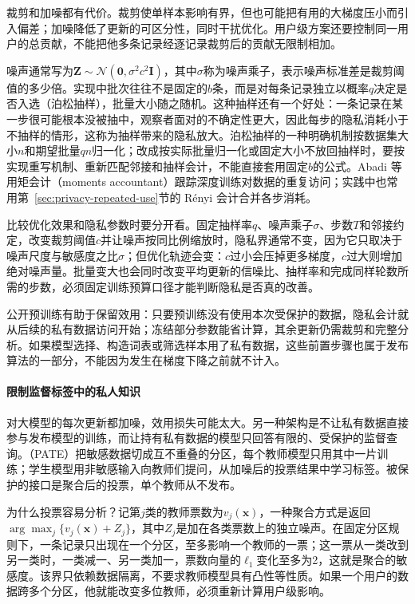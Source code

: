 裁剪和加噪都有代价。裁剪使单样本影响有界，但也可能把有用的大梯度压小而引入偏差；加噪降低了更新的可区分性，同时干扰优化。用户级方案还要控制同一用户的总贡献，不能把他多条记录经逐记录裁剪后的贡献无限制相加。

噪声通常写为$\bm Z\sim\mathcal N(\bm0,\sigma^2c^2\bm I)$，其中$\sigma$称为噪声乘子，表示噪声标准差是裁剪阈值的多少倍。实现中批次往往不是固定的$b$条，而是对每条记录独立以概率$q$决定是否入选（泊松抽样），批量大小随之随机。这种抽样还有一个好处：一条记录在某一步很可能根本没被抽中，观察者面对的不确定性更大，因此每步的隐私消耗小于不抽样的情形，这称为抽样带来的隐私放大。泊松抽样的一种明确机制按数据集大小$n$和期望批量$qn$归一化；改成按实际批量归一化或固定大小不放回抽样时，要按实现重写机制、重新匹配邻接和抽样会计，不能直接套用固定$b$的公式。Abadi 等用矩会计（moments accountant）跟踪深度训练对数据的重复访问；实践中也常用第~\ref{sec:privacy-repeated-use}节的 Rényi 会计合并各步消耗。

比较优化效果和隐私参数时要分开看。固定抽样率$q$、噪声乘子$\sigma$、步数$T$和邻接约定，改变裁剪阈值$c$并让噪声按同比例缩放时，隐私界通常不变，因为它只取决于噪声尺度与敏感度之比$\sigma$；但优化轨迹会变：$c$过小会压掉更多梯度，$c$过大则增加绝对噪声量。批量变大也会同时改变平均更新的信噪比、抽样率和完成同样轮数所需的步数，必须固定训练预算口径才能判断隐私是否真的改善。

公开预训练有助于保留效用：只要预训练没有使用本次受保护的数据，隐私会计就从后续的私有数据访问开始；冻结部分参数能省计算，其余更新仍需裁剪和完整分析。如果模型选择、构造词表或筛选样本用了私有数据，这些前置步骤也属于发布算法的一部分，不能因为发生在梯度下降之前就不计入。

\paragraph{限制监督标签中的私人知识}

对大模型的每次更新都加噪，效用损失可能太大。另一种架构是不让私有数据直接参与发布模型的训练，而让持有私有数据的模型只回答有限的、受保护的监督查询。（PATE）把敏感数据切成互不重叠的分区，每个教师模型只用其中一片训练；学生模型用非敏感输入向教师们提问，从加噪后的投票结果中学习标签。被保护的接口是聚合后的投票，单个教师从不发布。

为什么投票容易分析？记第$j$类的教师票数为$v_j(\bm x)$，一种聚合方式是返回$\arg\max_j\{v_j(\bm x)+Z_j\}$，其中$Z_j$是加在各类票数上的独立噪声。在固定分区规则下，一条记录只出现在一个分区，至多影响一个教师的一票；这一票从一类改到另一类时，一类减一、另一类加一，票数向量的$\ell_1$变化至多为2，这就是聚合的敏感度。该界只依赖数据隔离，不要求教师模型具有凸性等性质。如果一个用户的数据跨多个分区，他就能改变多位教师，必须重新计算用户级影响。

